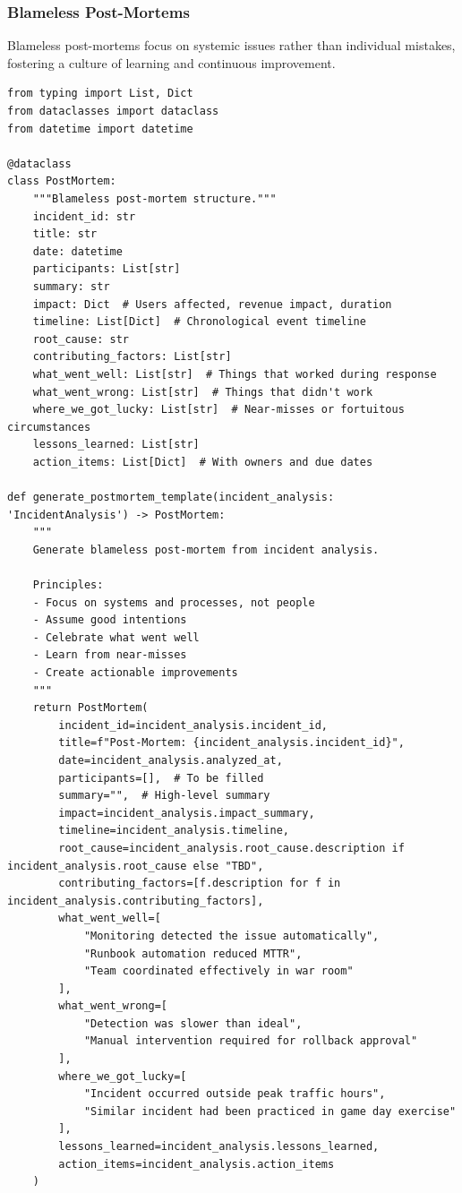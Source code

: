 \subsubsection{Blameless Post-Mortems}

Blameless post-mortems focus on systemic issues rather than individual mistakes, fostering a culture of learning and continuous improvement.

\begin{lstlisting}[style=python, caption={Blameless post-mortem template}]
from typing import List, Dict
from dataclasses import dataclass
from datetime import datetime

@dataclass
class PostMortem:
    """Blameless post-mortem structure."""
    incident_id: str
    title: str
    date: datetime
    participants: List[str]
    summary: str
    impact: Dict  # Users affected, revenue impact, duration
    timeline: List[Dict]  # Chronological event timeline
    root_cause: str
    contributing_factors: List[str]
    what_went_well: List[str]  # Things that worked during response
    what_went_wrong: List[str]  # Things that didn't work
    where_we_got_lucky: List[str]  # Near-misses or fortuitous circumstances
    lessons_learned: List[str]
    action_items: List[Dict]  # With owners and due dates

def generate_postmortem_template(incident_analysis: 'IncidentAnalysis') -> PostMortem:
    """
    Generate blameless post-mortem from incident analysis.

    Principles:
    - Focus on systems and processes, not people
    - Assume good intentions
    - Celebrate what went well
    - Learn from near-misses
    - Create actionable improvements
    """
    return PostMortem(
        incident_id=incident_analysis.incident_id,
        title=f"Post-Mortem: {incident_analysis.incident_id}",
        date=incident_analysis.analyzed_at,
        participants=[],  # To be filled
        summary="",  # High-level summary
        impact=incident_analysis.impact_summary,
        timeline=incident_analysis.timeline,
        root_cause=incident_analysis.root_cause.description if incident_analysis.root_cause else "TBD",
        contributing_factors=[f.description for f in incident_analysis.contributing_factors],
        what_went_well=[
            "Monitoring detected the issue automatically",
            "Runbook automation reduced MTTR",
            "Team coordinated effectively in war room"
        ],
        what_went_wrong=[
            "Detection was slower than ideal",
            "Manual intervention required for rollback approval"
        ],
        where_we_got_lucky=[
            "Incident occurred outside peak traffic hours",
            "Similar incident had been practiced in game day exercise"
        ],
        lessons_learned=incident_analysis.lessons_learned,
        action_items=incident_analysis.action_items
    )


\end{lstlisting}
